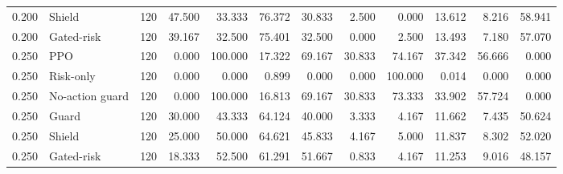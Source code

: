 \begin{tabular}{rlrrrrrrrrrr}
0.200 & Shield & 120 & 47.500 & 33.333 & 76.372 & 30.833 & 2.500 & 0.000 & 13.612 & 8.216 & 58.941 \\
0.200 & Gated-risk & 120 & 39.167 & 32.500 & 75.401 & 32.500 & 0.000 & 2.500 & 13.493 & 7.180 & 57.070 \\
0.250 & PPO & 120 & 0.000 & 100.000 & 17.322 & 69.167 & 30.833 & 74.167 & 37.342 & 56.666 & 0.000 \\
0.250 & Risk-only & 120 & 0.000 & 0.000 & 0.899 & 0.000 & 0.000 & 100.000 & 0.014 & 0.000 & 0.000 \\
0.250 & No-action guard & 120 & 0.000 & 100.000 & 16.813 & 69.167 & 30.833 & 73.333 & 33.902 & 57.724 & 0.000 \\
0.250 & Guard & 120 & 30.000 & 43.333 & 64.124 & 40.000 & 3.333 & 4.167 & 11.662 & 7.435 & 50.624 \\
0.250 & Shield & 120 & 25.000 & 50.000 & 64.621 & 45.833 & 4.167 & 5.000 & 11.837 & 8.302 & 52.020 \\
0.250 & Gated-risk & 120 & 18.333 & 52.500 & 61.291 & 51.667 & 0.833 & 4.167 & 11.253 & 9.016 & 48.157 \\
\bottomrule
\end{tabular}
